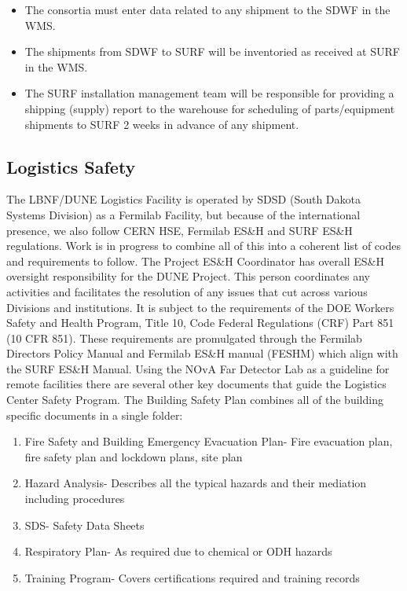 \begin{itemize}
\item The consortia must enter data related to any shipment to the SDWF in the WMS.
\item The shipments from SDWF to SURF will be inventoried as received at SURF in the WMS.
\item The SURF installation management team will be responsible for providing a shipping (supply) report to the warehouse for scheduling of parts/equipment shipments to SURF 2 weeks in advance of any shipment.
\end{itemize}







\subsection{Logistics Safety}
\label{sec:fdsp-tc-log-safety}

The LBNF/DUNE Logistics Facility is operated by SDSD (South Dakota Systems Division) as a Fermilab Facility, but because of the international presence, we also follow CERN HSE, Fermilab ES\&H and SURF ES\&H regulations.  Work is in progress to combine all of this into a coherent list of codes and requirements to follow. The  Project ES\&H Coordinator has overall ES\&H oversight responsibility for the DUNE Project.  This person coordinates any activities and facilitates the resolution of any issues that cut across various Divisions and institutions. It is subject to the requirements of the DOE Workers Safety and Health Program, Title 10, Code Federal Regulations (CRF) Part 851 (10 CFR 851). These requirements are promulgated through the Fermilab Directors Policy Manual and Fermilab ES\&H manual (FESHM) which align with the SURF ES\&H Manual. 
Using the NOvA Far Detector Lab as a guideline for remote facilities there are several other key documents that guide the Logistics Center Safety Program.  The Building Safety Plan combines all of the building specific documents in a single folder:

\begin{enumerate}
\item	Fire Safety and Building Emergency Evacuation Plan- Fire evacuation plan, fire safety plan and lockdown plans, site plan
\item	Hazard Analysis- Describes all the typical hazards and their mediation including procedures 
\item	SDS- Safety Data Sheets
\item	Respiratory Plan- As required due to chemical or ODH hazards
\item	Training Program- Covers certifications required and  training records
\end{enumerate}


